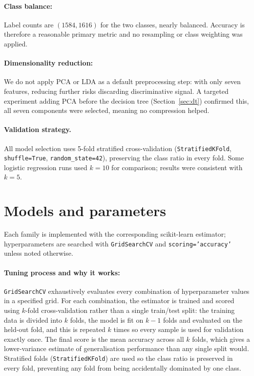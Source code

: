 \documentclass[11pt]{article}
\begin{document}
\paragraph{Class balance:}
Label counts are $(1584, 1616)$ for the two classes, nearly balanced.
Accuracy is therefore a reasonable primary metric and no resampling or class weighting was applied.

\paragraph{Dimensionality reduction:}
We do not apply PCA or LDA as a default preprocessing step: with only seven features, reducing further risks discarding discriminative signal.
A targeted experiment adding PCA before the decision tree (Section~\ref{sec:dt}) confirmed this, all seven components were selected, meaning no compression helped.

\paragraph{Validation strategy.}
All model selection uses 5-fold stratified cross-validation (\texttt{StratifiedKFold}, \texttt{shuffle=True}, \texttt{random\_state=42}), preserving the class ratio in every fold.
Some logistic regression runs used $k=10$ for comparison; results were consistent with $k=5$.

\section{Models and parameters}

Each family is implemented with the corresponding scikit-learn estimator; hyperparameters are searched with \texttt{GridSearchCV} and \texttt{scoring='accuracy'} unless noted otherwise.

\paragraph{Tuning process and why it works:}
\texttt{GridSearchCV} exhaustively evaluates every combination of hyperparameter values in a specified grid.
For each combination, the estimator is trained and scored using $k$-fold cross-validation rather than a single train/test split: the training data is divided into $k$ folds, the model is fit on $k-1$ folds and evaluated on the held-out fold, and this is repeated $k$ times so every sample is used for validation exactly once.
The final score is the mean accuracy across all $k$ folds, which gives a lower-variance estimate of generalisation performance than any single split would.
Stratified folds (\texttt{StratifiedKFold}) are used so the class ratio is preserved in every fold, preventing any fold from being accidentally dominated by one class.
\end{document}
